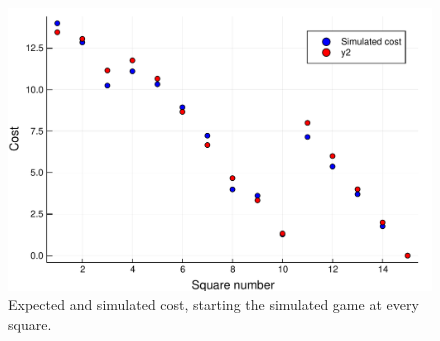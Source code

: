 \begin{figure}[H]
  \begin{center}
    \includegraphics[scale=0.41]{../img/board_unif_low/cost_per_square_100_iter.pdf}
  \end{center}
  \caption{Expected and simulated cost, starting the simulated game at every square.}
  \label{fig:cost_square_unif_low}
\end{figure}




